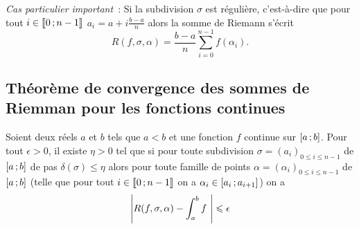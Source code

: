 \emph{Cas particulier important}~: Si la subdivision \(\sigma\) est régulière, c'est-à-dire que pour tout \(i \in \mathopen{\llbracket}0\mathclose{}\mathpunct{};n-1\mathclose{\rrbracket}\) \(a_i=a+i \frac{b-a}{n}\) alors la somme de Riemann s'écrit
\begin{equation}
  R(f,\sigma,\alpha) = \frac{b-a}{n} \sum_{i=0}^{n-1}f(\alpha_i).
\end{equation}

\subsection{Théorème de convergence des sommes de Riemman pour les fonctions continues}

\begin{theo}
  Soient deux réels \(a\) et \(b\) tels que \(a<b\) et une fonction \(f\) continue sur \(\left[ a \, ;  b \right]\). Pour tout \(\epsilon >0\), il existe \(\eta >0\) tel que si pour toute subdivision \(\sigma=(a_i)_{0 \leqslant i \leqslant n-1}\) de \(\left[ a \, ;  b \right]\) de pas \(\delta(\sigma) \leqslant \eta\) alors pour toute famille de points \(\alpha=(\alpha_i)_{0 \leqslant i \leqslant n-1}\) de \(\left[ a \, ;  b \right]\) (telle que pour tout \(i \in \mathopen{\llbracket}0\mathclose{}\mathpunct{};n-1\mathclose{\rrbracket}\) on a \(\alpha_i \in \left[ a_i \, ;  a_{i+1} \right]\)) on a
  \begin{equation}
    \left\lvert R(f,\sigma,\alpha)- \int_a^b f~\right\rvert \leqslant \epsilon
  \end{equation}
\end{theo}
